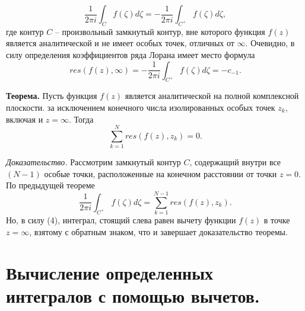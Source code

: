 \documentclass[9pt]{article}
\begin{document}
\[\dfrac{1}{2\pi i}\int_Cf(\zeta)d\zeta=-\dfrac{1}{2\pi i}\int_{C^+}f(\zeta)d\zeta,\]
где контур \(C\) -- произвольный замкнутый контур, вне которого функция \(f(z)\) является аналитической и не имеет особых точек, отличных от \(\infty\). Очевидно, в силу определения коэффициентов ряда Лорана имеет место формула
\begin{equation}
    res(f(z),\infty)=-\dfrac{1}{2\pi i}\int_{C^+}f(\zeta)d\zeta=-c_{-1}.
\end{equation}
\par\textbf{Теорема.} Пусть функция \(f(z)\) является аналитической на полной комплексной плоскости. за исключением конечного числа изолированных особых точек \(z_k\), включая и \(z=\infty\). Тогда
\begin{equation}
    \sum_{k=1}^Nres(f(z),z_k)=0.
\end{equation}
\par\textit{Доказательство.} Рассмотрим замкнутый контур \(C\), содержащий внутри все \((N-1)\) особые точки, расположенные на конечном расстоянии от точки \(z=0\). По предыдущей теореме
\[\dfrac{1}{2\pi i}\int_{C^+}f(\zeta)d\zeta=\sum_{k=1}^{N-1}res(f(z),z_k).\]
Но, в силу (4), интеграл, стоящий слева равен вычету функции \(f(z)\) в точке \(z=\infty\), взятому с обратным знаком, что и завершает доказательство теоремы.

\section{Вычисление определенных интегралов с помощью вычетов.}
\end{document}
